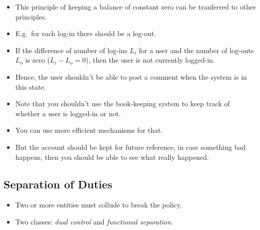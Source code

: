 \begin{frame}
  \begin{itemize}
    \item This principle of keeping a balance of constant zero can be 
      tranferred to other principles.

    \item E.g.\ for each log-in there should be a log-out.

    \item If the difference of number of log-ins \(L_i\) for a user and the 
      number of log-outs \(L_o\) is zero (\(L_i-L_o = 0\)), then the user is 
      not currently logged-in.

    \item Hence, the user shouldn't be able to post a comment when the system 
      is in this state.
  \end{itemize}
\end{frame}

\begin{frame}
  \begin{remark}
    \begin{itemize}
      \item Note that you shouldn't use the book-keeping system to keep track of 
        whether a user is logged-in or not.

      \item You can use more efficient mechanisms for that.

      \item But the account should be kept for future reference, in case 
        something bad happens, then you should be able to see what really 
        happened.
    \end{itemize}
  \end{remark}
\end{frame}

\subsection{Separation of Duties}

\begin{frame}
  \begin{definition}
    \begin{itemize}
      \item Two or more entities must collude to break the policy.
      \item Two classes: \emph{dual control} and \emph{functional separation}.
    \end{itemize}
  \end{definition}
\end{frame}


